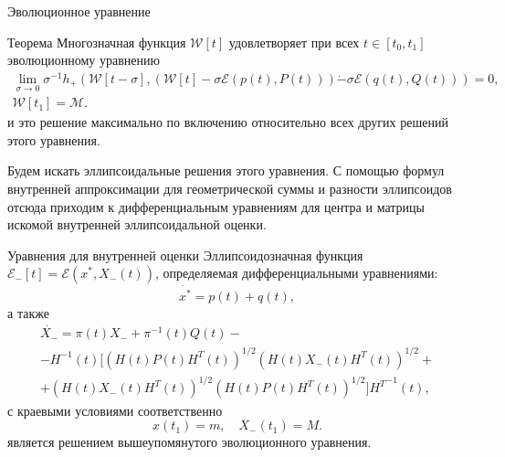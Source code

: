 \documentclass{beamer}
\begin{document}
\begin{frame}{Эволюционное уравнение}
\begin{block}{Теорема}
Многозначная функция \( \mathcal{W}[t] \) удовлетворяет при всех \( t \in [t_0, t_1 ]\) эволюционному уравнению
    \begin{gather*}
        \lim_{\sigma \to 0} \sigma^{-1} h_+ \left( \mathcal{W}[t - \sigma], \left( \mathcal{W}[t] - 
         \sigma \mathcal{E}(p(t), P(t)) \right) \dot{-} \sigma \mathcal{E}(q(t), Q(t)) \right) = 0, \\
        \mathcal{W}[t_1] = \mathcal{M}.
    \end{gather*}
и это решение максимально по включению относительно всех других решений этого уравнения.
\end{block}

Будем искать эллипсоидальные решения этого уравнения. С помощью формул внутренней аппроксимации для геометрической суммы и разности эллипсоидов отсюда приходим к дифференциальным уравнениям для центра и матрицы искомой внутренней эллипсоидальной оценки.

\end{frame}

\begin{frame}{Уравнения для внутренней оценки}
    Эллипсоидозначная функция \( \mathcal{E}_-[t] = \mathcal{E}(x^*, X_-(t)) \), определяемая
     дифференциальными уравнениями:
    \begin{equation*}
        \dot{x^*} = p(t) + q(t),
    \end{equation*}
    а также
    \begin{equation*}
        \begin{gathered}
            \dot{X_-} = \pi(t) X_- + \pi^{-1}(t) Q(t) - \\
             - H^{-1}(t) [(H(t) P(t) H^T(t))^{1/2} (H(t) X_-(t) H^T(t))^{1/2} + \\
             + (H(t) X_-(t) H^T(t))^{1/2}(H(t) P(t) H^T(t))^{1/2}] {H^T}^{-1}(t),
        \end{gathered}
    \end{equation*}
    с краевыми условиями соответственно
    \begin{equation*}
        x(t_1) = m, \quad X_-(t_1) = M.
    \end{equation*}
    является решением вышеупомянутого эволюционного уравнения.

\end{frame}
\end{document}
